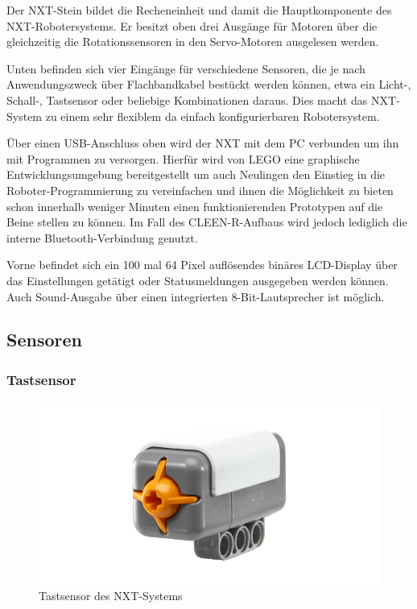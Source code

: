 Der NXT-Stein bildet die Recheneinheit und damit die Hauptkomponente des NXT-Robotersystems. Er besitzt oben drei Ausgänge für Motoren über die gleichzeitig die Rotationssensoren in den Servo-Motoren ausgelesen werden.

Unten befinden sich vier Eingänge für verschiedene Sensoren, die je nach Anwendungszweck über Flachbandkabel bestückt werden können, etwa ein Licht-, Schall-, Tastsensor oder beliebige Kombinationen daraus. Dies macht das NXT-System zu einem sehr flexiblem da einfach konfigurierbaren Robotersystem.

Über einen USB-Anschluss oben wird der NXT mit dem PC verbunden um ihn mit Programmen zu versorgen. Hierfür wird von LEGO eine graphische Entwicklungsumgebung bereitgestellt um auch Neulingen den Einstieg in die Roboter-Programmierung zu vereinfachen und ihnen die Möglichkeit zu bieten schon innerhalb weniger Minuten einen funktionierenden Prototypen auf die Beine stellen zu können. Im Fall des CLEEN-R-Aufbaus wird jedoch lediglich die interne Bluetooth-Verbindung genutzt.

Vorne befindet sich ein 100 mal 64 Pixel auflösendes binäres LCD-Display über das Einstellungen getätigt oder Statusmeldungen ausgegeben werden können. Auch Sound-Ausgabe über einen integrierten 8-Bit-Lautsprecher ist möglich.

\subsection{Sensoren}

\subsubsection{Tastsensor}

\begin{figure}[h]
\centering
\includegraphics[width=\textwidth/3]{Bilder/Robot/button_sensor}
\caption{Tastsensor des NXT-Systems}
\label{fig:buttonSensor}
\end{figure}

